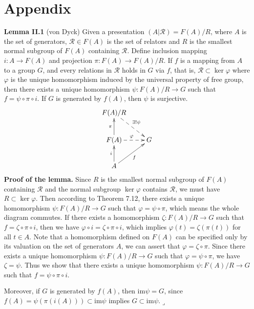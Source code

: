 \documentclass[12pt,letterpaper,boxed]{hmcpset}
\begin{document}
\section{Appendix}
\hypertarget{Lemma II.1}{}
\textbf{Lemma II.1} (von Dyck)
Given a presentation $(A|\mathscr{R})=F(A)/R$, where $A$ is the set of generators, $\mathscr{R}\in F(A)$ is the set of relators and $R$ is the smallest normal subgroup of $F(A)$ containing $\mathscr{R}$. Define inclusion mapping $i:A\to F(A)$ and projection $\pi:F(A)\to F(A)/R$. If $f$ is a mapping from $A$ to a group $G$, and every relations in $\mathscr{R}$ holds in $G$ via $f$, that is, $\mathscr{R}\subset\ker\varphi$ where $\varphi$ is the unique homomorphism induced by the universal property of free group, then there exists a unique homomorphism $\psi:F(A)/R\to G$ such that $f=\psi\circ\pi\circ i$. If $G$ is generated by $f(A)$, then $\psi$ is surjective.
\[\xymatrix{
	F(A)/R\ar@{-->}[rd]^{\exists!\psi}\\
	F(A)\ar@{-->}[r]^{\varphi}\ar[u]^{\pi} &G\\
	A\ar[ru]_{f}\ar[u]^{i}&    
}\]
\textbf{Proof of the lemma.} Since $R$ is the smallest normal subgroup of $F(A)$ containing $\mathscr{R}$ and the normal subgroup $\ker\varphi$ contains $\mathscr{R}$, we must have $R\subset\ker\varphi$. Then according to Theorem 7.12, there exists a unique homomorphism $\psi:F(A)/R\to G$ such that $\varphi=\psi\circ\pi$, which means the whole diagram commutes. If there exists a homomorphism $\zeta:F(A)/R\to G$ such that $f=\zeta\circ\pi\circ i$, then we have $\varphi\circ i=\zeta\circ\pi\circ i$, which implies $\varphi(t)= \zeta(\pi(t))$ for all $t\in A$. Note that a homomorphism  defined on $F(A)$ can be specified only by its valuation on the set of generators $A$, we can assert that $\varphi=\zeta\circ\pi$. Since there exists a unique homomorphism $\psi:F(A)/R\to G$ such that $\varphi=\psi\circ\pi$, we have $\zeta=\psi$. Thus we show that there exists a unique homomorphism $\psi:F(A)/R\to G$ such that $f=\psi\circ\pi\circ i$.

Moreover, if $G$ is generated by $f(A)$, then $\mathrm{im}\psi=G$, since $f(A)=\psi(\pi( i(A)))\subset\mathrm{im}\psi$ implies $G\subset\mathrm{im}\psi$.\hfill$\lrcorner$


\newpage





\end{document}
